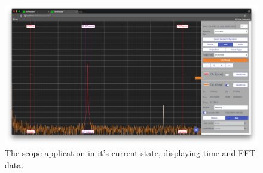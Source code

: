 \begin{figure}
    \centering
    \includegraphics[width=1\textwidth]{images/gui/scope}
    \caption[The scope application]{%
        The scope application in it's current state, displaying time and FFT data.%
    }
    \label{fig:usegruide:screenshot}
\end{figure}


